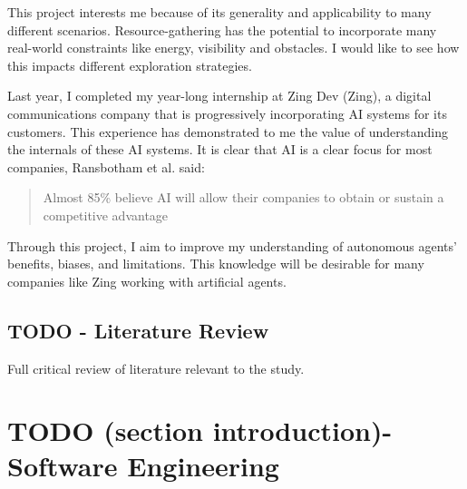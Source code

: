 \documentclass[]{final_report}
\begin{document}
This project interests me because of its generality and applicability to many different scenarios. Resource-gathering has the potential to incorporate many real-world constraints like energy, visibility and obstacles. I would like to see how this impacts different exploration strategies.

Last year, I completed my year-long internship at Zing Dev (Zing), a digital communications company that is progressively incorporating AI systems for its customers. This experience has demonstrated to me the value of understanding the internals of these AI systems. It is clear that AI is a clear focus for most companies, Ransbotham et al. said: 
\begin{quote}
  Almost 85\% believe AI will allow their companies to obtain or sustain a competitive advantage \cite{ransbotham2017reshaping}
\end{quote}

Through this project, I aim to improve my understanding of autonomous agents' benefits, biases, and limitations. This knowledge will be desirable for many companies like Zing working with artificial agents.


\section{TODO - Literature Review}


Full critical review of literature relevant to the study.


\chapter{TODO (section introduction)- Software Engineering}
\end{document}
